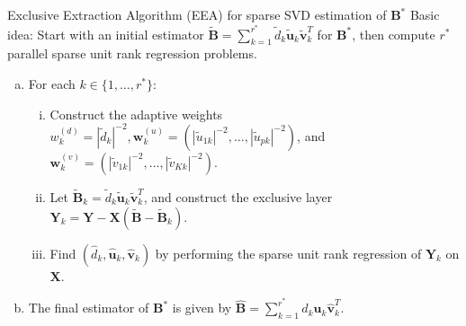 \documentclass[notes]{beamer}       %
\begin{document}
\begin{frame}{Exclusive Extraction Algorithm (EEA) for sparse SVD estimation of \(\boldsymbol{B}^*\)}
  Basic idea: Start with an initial estimator \(\tilde{\boldsymbol{B}}= \sum_{k=1}^{r^*} \tilde{d}_k \tilde{\boldsymbol{u}}_k \tilde{\boldsymbol{v}}_k^T \) for \(\boldsymbol{B}^*\), then compute \(r^*\) parallel sparse unit rank regression problems.
  \begin{enumerate}[(a)]
  \item For each \(k \in \{1, \ldots, r^*\}\):
  
  \begin{enumerate}[(i)]
  
  \item Construct the adaptive weights \(w_k^{(d)} = | \tilde{d}_k|^{-2}, \boldsymbol{w}_k^{(u)} = (| \tilde{u}_{1k}|^{-2}, \ldots, | \tilde{u}_{pk}|^{-2})\), and \(\boldsymbol{w}_k^{(v)} = (| \tilde{v}_{1k}|^{-2}, \ldots, | \tilde{v}_{Kk}|^{-2})\).
  
  \item Let \( \tilde{\boldsymbol{B}}_k = \tilde{d}_k \tilde{\boldsymbol{u}}_k \tilde{\boldsymbol{v}}_k^T \), and construct the exclusive layer \(\boldsymbol{Y}_k = \boldsymbol{Y} - \boldsymbol{X}(\tilde{\boldsymbol{B}} - \tilde{\boldsymbol{B}}_k)\).
  \item Find \((\hat{d}_k, \hat{\boldsymbol{u}}_k, \hat{\boldsymbol{v}}_k) \) by performing the sparse unit rank regression of \(\boldsymbol{Y}_k\) on \(\boldsymbol{X}\). 
  
  \end{enumerate}
  
  \item The final estimator of \(\boldsymbol{B}^*\) is given by \(\hat{\boldsymbol{B}} = \sum_{k=1}^{r^*} \hat{d}_k \hat{\boldsymbol{u}}_k \hat{\boldsymbol{v}}_k^T\).
  
  \end{enumerate}
  
    
\end{frame}
\end{document}
